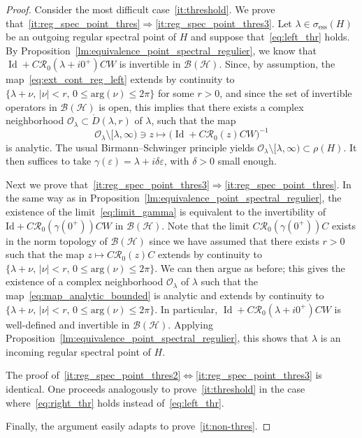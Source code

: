 \documentclass[AHL,Unicode,longabstracts,published]{cedram}
\newcommand{\Hi}{\mathcal{H}}
\newcommand{\ess}{\mathrm{ess}}
\newcommand{\Res}{\mathcal{R}}
\newcommand{\clB}{\mathcal{B}}
\DeclareMathOperator{\Id}{Id}
\newcommand{\Hi}{\mathcal{H}}
\newcommand{\ess}{\mathrm{ess}}
\begin{document}
\begin{proof}
Consider the most difficult case~\eqref{it:threshold}. We prove that~\eqref{it:reg_spec_point_thres}$\Rightarrow$\eqref{it:reg_spec_point_thres3}. Let $\lambda\in\sigma_{\ess}(H)$ be an outgoing regular spectral point of $H$ and suppose that~\eqref{eq:left_thr} holds. By Proposition~\ref{lm:equivalence_point_spectral_regulier}, we know that $\Id+C\Res_0(\lambda+ i0^+)CW$ is invertible in $\clB(\Hi)$. Since, by assumption, the map~\eqref{eq:ext_cont_reg_left} extends by continuity to $\{\lambda+\nu, \, |\nu|<r, \, 0\le\mathrm{arg}(\nu)\le2\pi\}$ for some $r>0$, and since the set of invertible operators in $\clB(\Hi)$ is open, this implies that there exists a complex neighborhood $\mathcal{O}_\lambda\subset \mathring{D}(\lambda,r)$ of $\lambda$, such that the map
\begin{equation}\label{eq:map_analytic_bounded}
\mathcal{O}_\lambda\setminus[\lambda,\infty)\ni z\mapsto \big(\Id+C\Res_0(z)CW\big)^{-1}
\end{equation}
is analytic. The usual Birmann--Schwinger principle yields $\mathcal{O}_\lambda\setminus[\lambda,\infty)\subset\rho(H)$. It then suffices to take $\gamma(\varepsilon)=\lambda+i\delta\varepsilon$, with $\delta>0$ small enough.

Next we prove that~\eqref{it:reg_spec_point_thres3}$\Rightarrow$\eqref{it:reg_spec_point_thres}. In the same way as in Proposition~\ref{lm:equivalence_point_spectral_regulier}, the existence of the limit~\eqref{eq:limit_gamma} is equivalent to the invertibility of $\mathrm{Id}+C\Res_0(\gamma(0^+))CW$ in $\clB(\Hi)$. Note that the limit $C\Res_0(\gamma(0^+))C$ exists in the norm topology of $\clB(\Hi)$ since we have assumed that there exists $r>0$ such that the map $z\mapsto C\Res_0(z)C$ extends by continuity to $\{\lambda+\nu, \, |\nu|<r, \, 0\le\mathrm{arg}(\nu)\le2\pi\}$. We can then argue as before; this gives the existence of a complex neighborhood $\mathcal{O}_\lambda$ of $\lambda$ such that the map~\eqref{eq:map_analytic_bounded} is analytic and extends by continuity to $\{\lambda+\nu, \, |\nu|<r, \, 0\le\mathrm{arg}(\nu)\le2\pi\}$. In particular, $\Id+C\Res_0(\lambda+ i0^+)CW$ is well-defined and invertible in $\clB(\Hi)$. Applying Proposition~\ref{lm:equivalence_point_spectral_regulier}, this shows that $\lambda$ is an incoming regular spectral point of $H$.

The proof of~\eqref{it:reg_spec_point_thres2}$\Leftrightarrow$\eqref{it:reg_spec_point_thres3} is identical. One proceeds analogously to prove~\eqref{it:threshold} in the case where~\eqref{eq:right_thr} holds instead of~\eqref{eq:left_thr}.

Finally, the argument easily adapts to prove~\eqref{it:non-thres}.
\end{proof}
\end{document}
